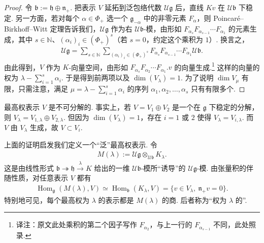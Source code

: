 \begin{proof}
令 $\mathfrak b:=\mathfrak h\oplus\mathfrak n_+$. 把表示 $V$ 延拓到泛包络代数 $\mathcal U\mathfrak g$ 后，直线 $Kv$ 在 $\mathcal U\mathfrak b$ 下稳定. 另一方面，若对每个 $\alpha\in\Phi_+$ 选一个 $\mathfrak g_{-\alpha}$ 中的非零元素 $F_\alpha$，则 Poincaré--Birkhoff--Witt 定理告诉我们，$\mathcal U\mathfrak g$ 作为右 $\mathcal U\mathfrak b$-模，由形如 $F_{\alpha_s}F_{\alpha_{s-1}}\cdots F_{\alpha_1}$ 的元素生成，其中 $s\in\mathbb N$、$(\alpha_i)_i\in(\Phi_+)^s$（若 $s=0$，约定这个乘积为 $1$）. 换言之，
\begin{align*}
\mathcal U\mathfrak g=\sum_{s\in\mathbb N}\sum_{(\alpha_i)_i\in(\Phi_+)^s}F_{\alpha_s}F_{\alpha_{s-1}}\cdots F_{\alpha_1}\mathcal U\mathfrak b.
\end{align*}
由此得到，$V$ 作为 $K$-向量空间，由形如 $F_{\alpha_s}F_{\alpha_2}\cdots F_{\alpha_1}.v$ 的向量生成.\footnote{译注：原文此处乘积的第二个因子写作 $F_{\alpha_2}$，与上一行的 $F_{\alpha_{s-1}}$ 不同，此处照录.}
这样的向量的权为 $\lambda-\sum_{i=1}^s\alpha_i$. 于是得到前两项以及 $\dim(V_\lambda)=1$. 为了说明 $\dim V_\mu$ 有限，只需注意，满足 $\mu=\lambda-\sum_{i=1}^s\alpha_i$ 的序列 $\alpha_1,\alpha_2,\ldots,\alpha_s$ 只有有限多个.
\end{proof}
\begin{remark*}
最高权表示 $V$ 是不可分解的. 事实上，若 $V=V_1\oplus V_2$ 是一个在 $\mathfrak g$ 下稳定的分解，则 $V_\lambda=V_{1,\lambda}\oplus V_{2,\lambda}$. 但因为 $\dim(V_\lambda)=1$，存在 $i=1$ 或 $2$ 使得 $V_\lambda=V_{i,\lambda}$. 而 $V$ 由 $V_\lambda$ 生成，故 $V\subset V_i$.
\end{remark*}
\begin{numpara}[Verma 模]\label{np:ssl-4-1-5}
上面的证明启发我们定义一个``泛''最高权表示. 令
\begin{align*}
M(\lambda):=\mathcal U\mathfrak g\otimes_{\mathcal U\mathfrak b}K_\lambda.
\end{align*}
这是由线性形式 $\mathfrak b\twoheadrightarrow\mathfrak h\xrightarrow{\lambda}K$ 给出的一维 $\mathcal U\mathfrak b$-模所``诱导''的 $\mathcal U\mathfrak g$-模. 由张量积的伴随性质，对任意表示 $V$ 都有
\begin{align*}
\operatorname{Hom}_{\mathfrak g}(M(\lambda),V)\simeq\operatorname{Hom}_{\mathfrak b}(K_\lambda,V)=\{v\in V_\lambda,\ \mathfrak n_+v=0\}.
\end{align*}
特别地可见，每个最高权为 $\lambda$ 的表示都是 $M(\lambda)$ 的商. 后者称为``权为 $\lambda$ 的''.
\end{numpara}

